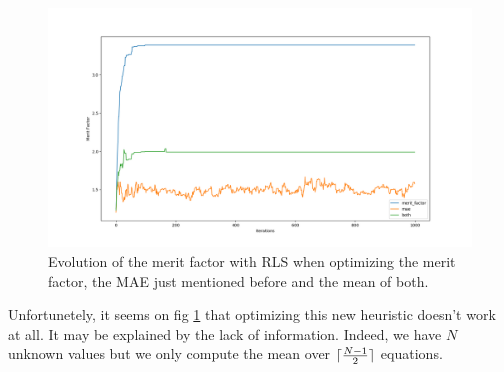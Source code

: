 \documentclass[a4paper,11pt,openany]{article}
\DeclarePairedDelimiter{\ceil}{\lceil}{\rceil}
\begin{document}
\begin{figure}[H]
\begin{center}
\includegraphics[scale=0.22]{Images/rls_both_heuristics}
\caption{Evolution of the merit factor with RLS when optimizing the merit factor, the MAE just mentioned before and the mean of both.}
\label{fig:rls_both_heuristics}
\end{center}
\end{figure}
\noindent
Unfortunetely, it seems on fig \ref{fig:rls_both_heuristics} that optimizing this new heuristic doesn't work at all. It may be explained by the lack of information. Indeed, we have $N$ unknown values but we only compute the mean over $\ceil{\frac{N-1}{2}}$ equations.\\
\end{document}
